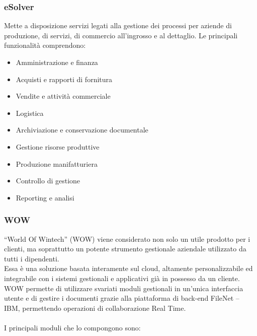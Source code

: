 \subsubsection*{eSolver}
Mette a disposizione servizi legati alla gestione dei processi per aziende di produzione, di servizi, di commercio all'ingrosso e al dettaglio. 
Le principali funzionalità comprendono: 
\begin{itemize}
    \item Amministrazione e finanza 
    \item Acquisti e rapporti di fornitura 
    \item Vendite e attività commerciale 
    \item Logistica
    \item Archiviazione e conservazione documentale
    \item Gestione risorse produttive 
    \item Produzione manifatturiera  
    \item Controllo di gestione 
    \item Reporting e analisi 
\end{itemize}

\subsubsection*{WOW}
“World Of Wintech” (WOW) viene considerato non solo un utile prodotto per i clienti, ma soprattutto un potente strumento gestionale aziendale utilizzato da tutti i dipendenti.\\ 
Essa è una soluzione basata interamente sul cloud, altamente personalizzabile ed integrabile con i sistemi gestionali e applicativi già in possesso da un cliente.\\
WOW permette di utilizzare svariati moduli gestionali in un'unica interfaccia utente e di gestire i documenti grazie alla piattaforma di back-end FileNet – IBM, permettendo operazioni di collaborazione Real Time.\\\\
I principali moduli che lo compongono sono: 

